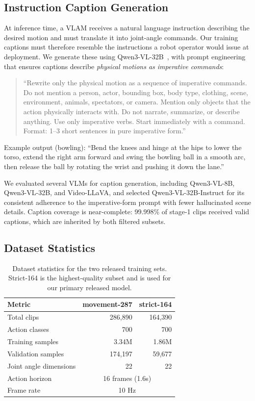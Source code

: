 \documentclass[letterpaper, 10pt, conference]{ieeeconf}
\begin{document}
\subsection{Instruction Caption Generation}
\label{sec:captioning}

At inference time, a VLAM receives a natural language instruction describing the desired motion and must translate it into joint-angle commands. Our training captions must therefore resemble the instructions a robot operator would issue at deployment. We generate these using Qwen3-VL-32B~\cite{qwen3vl}, with prompt engineering that ensures captions describe \emph{physical motions as imperative commands}:

\begin{quote}
\small
``Rewrite only the physical motion as a sequence of imperative commands. Do not mention a person, actor, bounding box, body type, clothing, scene, environment, animals, spectators, or camera. Mention only objects that the action physically interacts with. Do not narrate, summarize, or describe anything. Use only imperative verbs. Start immediately with a command. Format: 1--3 short sentences in pure imperative form.''
\end{quote}

Example output (bowling): ``Bend the knees and hinge at the hips to lower the torso, extend the right arm forward and swing the bowling ball in a smooth arc, then release the ball by rotating the wrist and pushing it down the lane.''

We evaluated several VLMs for caption generation, including Qwen3-VL-8B, Qwen3-VL-32B, and Video-LLaVA, and selected Qwen3-VL-32B-Instruct for its consistent adherence to the imperative-form prompt with fewer hallucinated scene details. Caption coverage is near-complete: 99.998\% of stage-1 clips received valid captions, which are inherited by both filtered subsets.

\subsection{Dataset Statistics}

\begin{table}[h]
\centering
\caption{Dataset statistics for the two released training sets. Strict-164 is the highest-quality subset and is used for our primary released model.}
\label{tab:dataset}
\begin{tabular}{lrr}
\toprule
\textbf{Metric} & \textbf{movement-287} & \textbf{strict-164} \\
\midrule
Total clips & 286{,}890 & 164{,}390 \\
Action classes & 700 & 700 \\
Training samples & 3.34M & 1.86M \\
Validation samples & 174{,}197 & 59{,}677 \\
Joint angle dimensions & 22 & 22 \\
Action horizon & \multicolumn{2}{c}{16 frames (1.6s)} \\
Frame rate & \multicolumn{2}{c}{10 Hz} \\
\bottomrule
\end{tabular}
\end{table}
\end{document}
